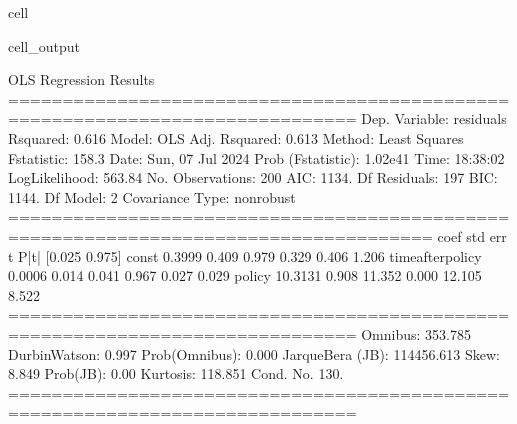 \documentclass[letterpaper,10pt,english]{jupyterBook}
\begin{document}
\begin{sphinxuseclass}{cell}
\begin{sphinxVerbatimOutput}
\begin{sphinxuseclass}{cell_output}
\begin{sphinxVerbatim}[commandchars=\\\{\}]
                            OLS Regression Results                            
==============================================================================
Dep. Variable:              residuals   R\PYGZhy{}squared:                       0.616
Model:                            OLS   Adj. R\PYGZhy{}squared:                  0.613
Method:                 Least Squares   F\PYGZhy{}statistic:                     158.3
Date:                Sun, 07 Jul 2024   Prob (F\PYGZhy{}statistic):           1.02e\PYGZhy{}41
Time:                        18:38:02   Log\PYGZhy{}Likelihood:                \PYGZhy{}563.84
No. Observations:                 200   AIC:                             1134.
Df Residuals:                     197   BIC:                             1144.
Df Model:                           2                                         
Covariance Type:            nonrobust                                         
=====================================================================================
                        coef    std err          t      P\PYGZgt{}|t|      [0.025      0.975]
\PYGZhy{}\PYGZhy{}\PYGZhy{}\PYGZhy{}\PYGZhy{}\PYGZhy{}\PYGZhy{}\PYGZhy{}\PYGZhy{}\PYGZhy{}\PYGZhy{}\PYGZhy{}\PYGZhy{}\PYGZhy{}\PYGZhy{}\PYGZhy{}\PYGZhy{}\PYGZhy{}\PYGZhy{}\PYGZhy{}\PYGZhy{}\PYGZhy{}\PYGZhy{}\PYGZhy{}\PYGZhy{}\PYGZhy{}\PYGZhy{}\PYGZhy{}\PYGZhy{}\PYGZhy{}\PYGZhy{}\PYGZhy{}\PYGZhy{}\PYGZhy{}\PYGZhy{}\PYGZhy{}\PYGZhy{}\PYGZhy{}\PYGZhy{}\PYGZhy{}\PYGZhy{}\PYGZhy{}\PYGZhy{}\PYGZhy{}\PYGZhy{}\PYGZhy{}\PYGZhy{}\PYGZhy{}\PYGZhy{}\PYGZhy{}\PYGZhy{}\PYGZhy{}\PYGZhy{}\PYGZhy{}\PYGZhy{}\PYGZhy{}\PYGZhy{}\PYGZhy{}\PYGZhy{}\PYGZhy{}\PYGZhy{}\PYGZhy{}\PYGZhy{}\PYGZhy{}\PYGZhy{}\PYGZhy{}\PYGZhy{}\PYGZhy{}\PYGZhy{}\PYGZhy{}\PYGZhy{}\PYGZhy{}\PYGZhy{}\PYGZhy{}\PYGZhy{}\PYGZhy{}\PYGZhy{}\PYGZhy{}\PYGZhy{}\PYGZhy{}\PYGZhy{}\PYGZhy{}\PYGZhy{}\PYGZhy{}\PYGZhy{}
const                 0.3999      0.409      0.979      0.329      \PYGZhy{}0.406       1.206
time\PYGZus{}after\PYGZus{}policy     0.0006      0.014      0.041      0.967      \PYGZhy{}0.027       0.029
policy              \PYGZhy{}10.3131      0.908    \PYGZhy{}11.352      0.000     \PYGZhy{}12.105      \PYGZhy{}8.522
==============================================================================
Omnibus:                      353.785   Durbin\PYGZhy{}Watson:                   0.997
Prob(Omnibus):                  0.000   Jarque\PYGZhy{}Bera (JB):           114456.613
Skew:                           8.849   Prob(JB):                         0.00
Kurtosis:                     118.851   Cond. No.                         130.
==============================================================================


\end{sphinxVerbatim}
\end{sphinxuseclass}
\end{sphinxVerbatimOutput}
\end{sphinxuseclass}
\end{document}
